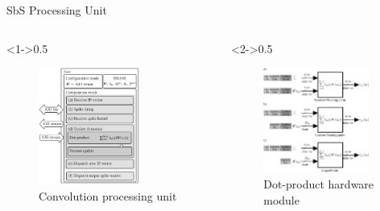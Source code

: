 \begin{frame}{SbS Processing Unit}
	\begin{columns}[c] %
		
		\begin{column}<1->{0.5\textwidth}
			\begin{figure}
				\includegraphics[width=0.7\textwidth]{../chapters/sbs_accelerator/figures/sbs_conv.pdf} %
				\caption{Convolution processing unit}
			\end{figure}
		\end{column}
		
		\begin{column}<2->{0.5\textwidth}
			\begin{figure}
				\includegraphics[width=0.9\textwidth]{../chapters/sbs_accelerator/figures/dot-product_unit.pdf} %
				\caption{Dot-product hardware module}
			\end{figure}
		\end{column}
		

\end{columns}
\end{frame}
